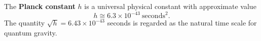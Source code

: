 The \textbf{Planck constant} $h$ is a universal physical constant with approximate value
$$
h \cong 6.3 \times 10^{-43}\ \text{seconds}^2.
$$
The quantity $\sqrt{h} = 6.43 \times 10^{-43}$ seconds is regarded as the natural time scale for quantum gravity.
